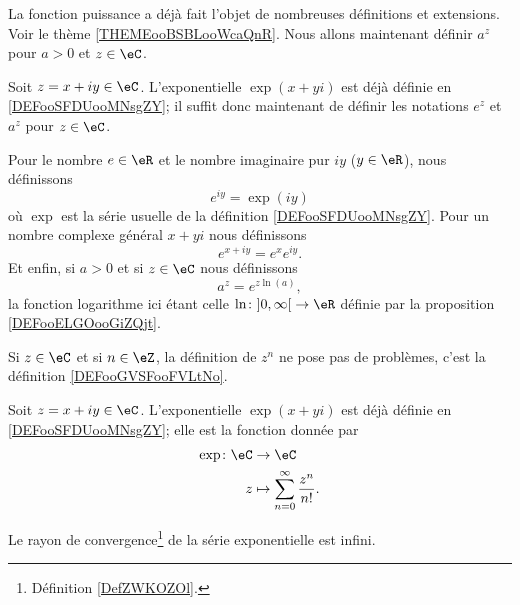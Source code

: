 La fonction puissance a déjà fait l'objet de nombreuses définitions et extensions. Voir le thème \ref{THEMEooBSBLooWcaQnR}. Nous allons maintenant définir \( a^z\) pour \( a>0\) et \( z\in \eC\). 


Soit \( z=x+iy\in \eC\). L'exponentielle \( \exp(x+yi)\) est déjà définie en \ref{DEFooSFDUooMNsgZY}; il suffit donc maintenant de définir les notations \(  e^{z}\) et \( a^z\) pour \( z\in \eC\).

\begin{definition}      \label{DEFooRBTDooNLcWGj}
    Pour le nombre \( e\in \eR\) et le nombre imaginaire pur \( iy\) (\( y\in \eR\)), nous définissons
    \begin{equation}
        e^{iy}=\exp(iy)
    \end{equation}
    où \( \exp\) est la série usuelle de la définition \ref{DEFooSFDUooMNsgZY}. Pour un nombre complexe général \( x+yi\) nous définissons
    \begin{equation}
        e^{x+iy}= e^{x} e^{iy}.
    \end{equation}
    Et enfin, si \( a>0\) et si \( z\in \eC\) nous définissons
    \begin{equation}
        a^z= e^{z\ln(a)},
    \end{equation}
    la fonction logarithme ici étant celle \( \ln\colon \mathopen] 0 , \infty \mathclose[\to \eR\) définie par la proposition \ref{DEFooELGOooGiZQjt}.
\end{definition}

Si \( z\in \eC\) et si \( n\in \eZ\), la définition de \( z^n\) ne pose pas de problèmes, c'est la définition \ref{DEFooGVSFooFVLtNo}.

\begin{normaltext}  \label{DefJilXoM}
    Soit \( z=x+iy\in \eC\). L'exponentielle \( \exp(x+yi)\) est déjà définie en \ref{DEFooSFDUooMNsgZY}; elle est la fonction donnée par
    \begin{equation}
        \begin{aligned}
            \exp\colon \eC&\to \eC \\
            z&\mapsto \sum_{n=0}^{\infty}\frac{ z^n }{ n! }.
        \end{aligned}
    \end{equation}
\end{normaltext}

\begin{proposition}     \label{PROPooXEYFooIEaPvU}
Le rayon de convergence\footnote{Définition \ref{DefZWKOZOl}.} de la série exponentielle est infini.
\end{proposition}


